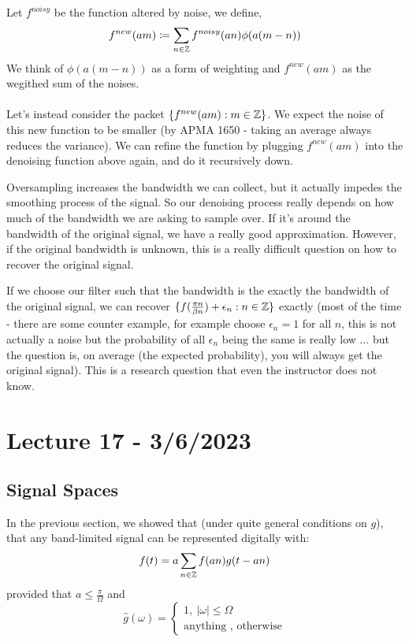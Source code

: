 \documentclass{article}
\begin{document}
\begin{definition}
Let $f^{noisy}$ be the function altered by noise, we define,
    $$f^{new}(am) \coloneqq \sum_{n \in \mathbb{Z}} f^{noisy}(an) \phi(a(m-n))$$
We think of $\phi(a(m-n))$ as a form of weighting and $f^{new}(am)$ as the wegithed sum of the noises.\\\\
Let's instead consider the packet $\{f^{new}(am): m \in \mathbb{Z}\}$. We expect the noise of this new function to be smaller (by APMA 1650 - taking an average always reduces the variance). We can refine the function by plugging $f^{new}(am)$ into the denoising function above again, and do it recursively down.
\end{definition}

\begin{remark}
Oversampling increases the bandwidth we can collect, but it actually impedes the smoothing process of the signal. So our denoising process really depends on how much of the bandwidth we are asking to sample over. If it's around the bandwidth of the original signal, we have a really good approximation. However, if the original bandwidth is unknown, this is a really difficult question on how to recover the original signal.    
\end{remark}

\begin{conjecture}
If we choose our filter such that the bandwidth is the exactly the bandwidth of the original signal, we can recover $\{f(\frac{\pi n}{\beta n}) + \epsilon_n: n \in \mathbb{Z}\}$ exactly (most of the time - there are some counter example, for example choose $\epsilon_n = 1$ for all $n$, this is not actually a noise but the probability of all $\epsilon_n$ being the same is really low ... but the question is, on average (the expected probability), you will always get the original signal). This is a research question that even the instructor does not know.
\end{conjecture}

\newpage
\section{Lecture 17 - 3/6/2023}

\subsection{Signal Spaces}
In the previous section, we showed that (under quite general conditions on $g$), that any band-limited signal can be represented digitally with:
\[f(t) = a \sum_{n \in \mathbb{Z}} f(an) g(t - an)\]
provided that $a \leq \frac{\pi}{\Omega}$ and
\[\widehat{g}(\omega) = \begin{cases}
    1,\ |\omega| \leq \Omega\\
    \text{anything , otherwise}
\end{cases}\]
\end{document}
